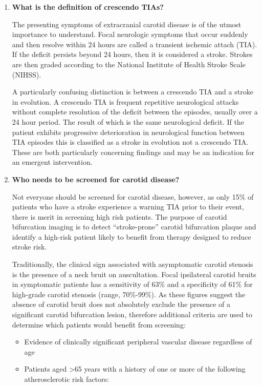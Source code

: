 \documentclass[
]{book}
\begin{document}
\begin{enumerate}
\def\labelenumi{\arabic{enumi}.}
\item
  \textbf{What is the definition of crescendo TIAs?}

  The presenting symptoms of extracranial carotid disease is of the
  utmost importance to understand. Focal neurologic symptoms that
  occur suddenly and then resolve within 24 hours are called a
  transient ischemic attach (TIA). If the deficit persists beyond 24
  hours, then it is considered a stroke. Strokes are then graded
  according to the National Institute of Health Stroke Scale
  (NIHSS).\citep{fischer2010}

  A particularly confusing distinction is between a crescendo TIA and
  a stroke in evolution. A crescendo TIA is frequent repetitive neurological
  attacks without complete resolution of the deficit between the
  episodes, usually over a 24 hour period. The result of which is the
  same neurological deficit. If the patient exhibits progressive
  deterioration in neurological function between TIA episodes this is
  classified as a stroke in evolution not a crescendo TIA.\citep{ricotta}
  These are both particularly concerning findings and may be an
  indication for an emergent intervention.
\item
  \textbf{Who needs to be screened for carotid disease?}

  Not everyone should be screened for carotid disease, however, as
  only 15\% of patients who have a stroke experience a warning TIA
  prior to their event, there is merit in screening high risk
  patients.\citep{rockman2019} The purpose of carotid bifurcation imaging
  is to detect ``stroke-prone'' carotid bifurcation plaque and identify
  a high-risk patient likely to benefit from therapy designed to
  reduce stroke risk.

  Traditionally, the clinical sign associated with asymptomatic
  carotid stenosis is the presence of a neck bruit on auscultation.
  Focal ipsilateral carotid bruits in symptomatic patients has a
  sensitivity of 63\% and a specificity of 61\% for high-grade carotid
  stenosis (range, 70\%-99\%). As these figures suggest the absence of
  carotid bruit does not absolutely exclude the presence of a
  significant carotid bifurcation lesion, therefore additional
  criteria are used to determine which patients would benefit from
  screening:

  \begin{itemize}
  \item
    Evidence of clinically significant peripheral vascular disease
    regardless of age
  \item
    Patients aged \textgreater65 years with a history of one or more of the
    following atherosclerotic risk factors:


\end{itemize}
\end{enumerate}
\end{document}
